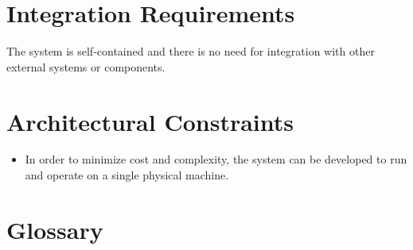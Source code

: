 \documentclass[12pt]{article}
\begin{document}
	\section{Integration Requirements}
	The system is self-contained and there is no need for integration with other external systems or components.
	\section{Architectural Constraints}
	\begin{itemize}
	\item In order to minimize cost and complexity, the system can be developed to run and operate on a single physical machine. 
	\end{itemize}
		
	\newpage				    
	\section{Glossary}				    			    			    		
\end{document}
